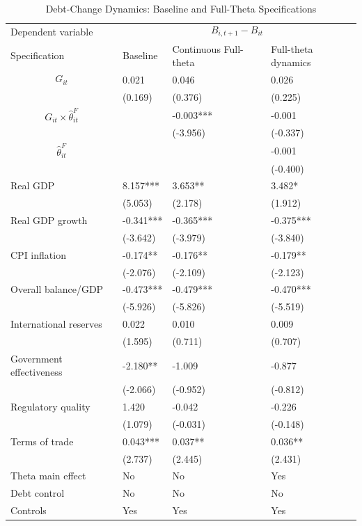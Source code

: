 \begin{table}[H]\centering
\begin{threeparttable}
\caption{Debt-Change Dynamics: Baseline and Full-Theta Specifications}
\label{tab:debt_change_combined_fulltheta}
\scriptsize
\begin{tabularx}{\textwidth}{lYYY}
\toprule
Dependent variable &  \\
\cmidrule(lr){2-4}
Specification & Baseline & Continuous Full-theta & Full-theta dynamics \\
\midrule
$$G_{it}$$ & 0.021 & 0.046 & 0.026 \\
 & (0.169) & (0.376) & (0.225) \\
$$G_{it}\times\widehat{\theta}^{F}_{it}$$ &  & -0.003*** & -0.001 \\
 &  & (-3.956) & (-0.337) \\
$$\widehat{\theta}^{F}_{it}$$ &  &  & -0.001 \\
 &  &  & (-0.400) \\
Real GDP & 8.157*** & 3.653** & 3.482* \\
 & (5.053) & (2.178) & (1.912) \\
Real GDP growth & -0.341*** & -0.365*** & -0.375*** \\
 & (-3.642) & (-3.979) & (-3.840) \\
CPI inflation & -0.174** & -0.176** & -0.179** \\
 & (-2.076) & (-2.109) & (-2.123) \\
Overall balance/GDP & -0.473*** & -0.479*** & -0.470*** \\
 & (-5.926) & (-5.826) & (-5.519) \\
International reserves & 0.022 & 0.010 & 0.009 \\
 & (1.595) & (0.711) & (0.707) \\
Government effectiveness & -2.180** & -1.009 & -0.877 \\
 & (-2.066) & (-0.952) & (-0.812) \\
Regulatory quality & 1.420 & -0.042 & -0.226 \\
 & (1.079) & (-0.031) & (-0.148) \\
Terms of trade & 0.043*** & 0.037** & 0.036** \\
 & (2.737) & (2.445) & (2.431) \\
\midrule
Theta main effect & No & No & Yes \\
Debt control & No & No & No \\
Controls & Yes & Yes & Yes \\

\end{tabularx}
\end{threeparttable}
\end{table}
